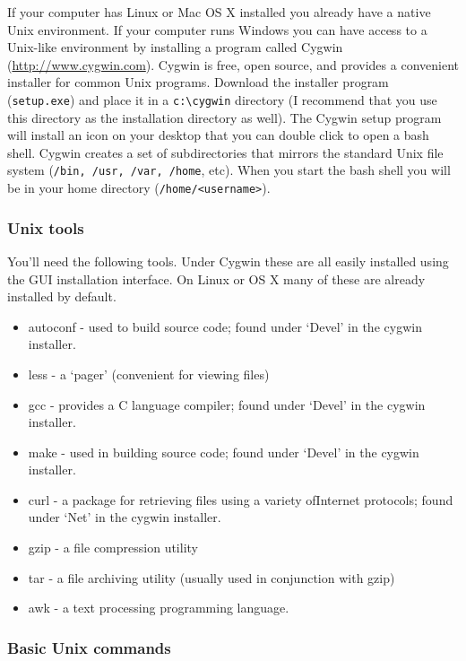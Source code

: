 If your computer has Linux or Mac OS X installed you already have a native Unix environment.  If your computer runs Windows you can have access to a Unix-like environment by installing a program called Cygwin (\href{http://www.cygwin.com}{http://www.cygwin.com}).  Cygwin is free, open source, and provides a convenient installer for common Unix programs.  Download the installer program (\verb=setup.exe=) and place it in a \verb=c:\cygwin= directory (I recommend that you use this directory as the installation directory as well).  The Cygwin setup program will install an icon on your desktop that you can double click to open a bash shell. Cygwin creates a set of subdirectories that mirrors the standard Unix file system (\verb=/bin, /usr, /var, /home=, etc). When you start the bash shell you will be in your home directory (\verb=/home/<username>=).

\subsubsection*{Unix tools}

You'll need the following tools. Under Cygwin these are all easily installed using the GUI installation interface. On Linux or OS X many of these are already installed by default.

\begin{itemize}
    \item autoconf - used to build source code; found under `Devel' in the cygwin installer.
    \item less - a `pager' (convenient for viewing files)
    \item gcc - provides a C language compiler; found under `Devel' in the cygwin installer.
    \item make - used in building source code; found under `Devel' in the cygwin installer.
    \item curl - a package for retrieving files using a variety ofInternet protocols; found under `Net' in the cygwin installer.
    \item gzip - a file compression utility
    \item tar - a file archiving utility (usually used in conjunction with gzip)
    \item awk - a text processing programming language.
\end{itemize}

\subsubsection*{Basic Unix commands}

